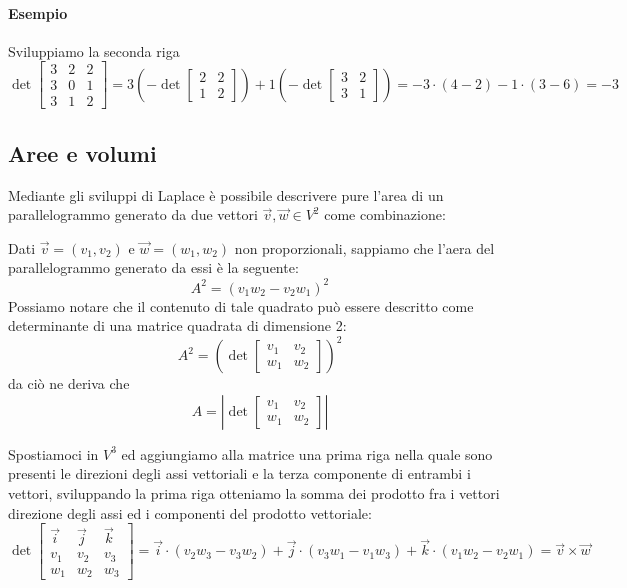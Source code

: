 		\begin{GrayBox}
			\paragraph{Esempio} Sviluppiamo la seconda riga
			$$ 
			\det \begin{bmatrix}
				3 & 2 & 2 \\
				3 & 0 & 1 \\
				3 & 1 & 2
			\end{bmatrix}
			= 3 \left(- \det \begin{bmatrix}
				2 & 2 \\
				1 & 2
			\end{bmatrix} \right)
			+ 1 \left(- \det \begin{bmatrix}
				3 & 2 \\
				3 & 1
			\end{bmatrix} \right)
			= -3 \cdot (4 - 2) - 1 \cdot (3 - 6) = -3
			$$
		\end{GrayBox}
	
		\subsection{Aree e volumi}
			Mediante gli sviluppi di Laplace è possibile descrivere pure l'area di un parallelogrammo generato da due vettori $\vec{v}, \vec{w} \in V^2$ come combinazione:
			
			Dati $\vec{v} = (v_1, v_2)$ e $\vec{w} = (w_1, w_2)$ non proporzionali, sappiamo che l'aera del parallelogrammo generato da essi è la seguente:
			$$A^2 = (v_1 w_2 - v_2 w_1)^2$$
			Possiamo notare che il contenuto di tale quadrato può essere descritto come determinante di una matrice quadrata di dimensione 2:
			$$A^2 = \left( \det \begin{bmatrix}
				v_1 & v_2 \\
				w_1 & w_2
			\end{bmatrix}\right)^2$$
			da ciò ne deriva che
			$$A = \left\vert \det \begin{bmatrix}
				v_1 & v_2 \\
				w_1 & w_2
			\end{bmatrix}\right\vert$$
			
			Spostiamoci in $V^3$ ed aggiungiamo alla matrice una prima riga nella quale sono presenti le direzioni degli assi vettoriali e la terza componente di entrambi i vettori, sviluppando la prima riga otteniamo la somma dei prodotto fra i vettori direzione degli assi ed i componenti del prodotto vettoriale:
			$$\det \begin{bmatrix}
				\vec{i} & \vec{j} & \vec{k} \\
				v_1 & v_2 & v_3 \\
				w_1 & w_2 & w_3
			\end{bmatrix} = \vec{i} \cdot (v_2 w_3 - v_3 w_2) + \vec{j} \cdot (v_3 w_1 - v_1 w_3) + \vec{k} \cdot (v_1 w_2 - v_2 w_1) = \vec{v} \times \vec{w} 
			$$
			
